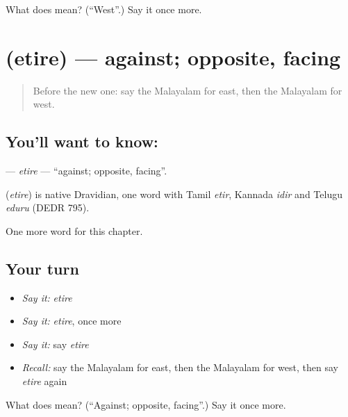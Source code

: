 \begin{tcolorbox}[breakable,colback=teal!4,colframe=teal!35!black,title={Before you move on}]
What does  mean? (\textquotedblleft{}West\textquotedblright{}.) Say it once more.
\end{tcolorbox}
\section[\texorpdfstring{\ml{എതിരെ} (etire)}{എതിരെ (etire)}]{ (etire) — against; opposite, facing}

\label{lesson:ML-C198-etire}



\begin{quote}
Before the new one: say the Malayalam for east, then the Malayalam for west.
\end{quote}

\subsection*{You'll want to know: }
\textbf{} — \emph{etire} — \textquotedblleft{}against; opposite, facing\textquotedblright{}.

\begin{cousinweb}
\textbf{} (\emph{etire}) is native Dravidian, one word with Tamil \emph{etir}, Kannada \emph{idir} and Telugu \emph{eduru} (DEDR 795).
\end{cousinweb}

\begin{grammarlens}[title={What you've built}]
One more word for this chapter.
\end{grammarlens}

\subsection*{Your turn}
\begin{itemize}
\raggedright
  \item \emph{Say it:} \emph{etire}
  \item \emph{Say it:} \emph{etire}, once more
  \item \emph{Say it:} say \emph{etire}
  \item \emph{Recall:} say the Malayalam for east, then the Malayalam for west, then say \emph{etire} again
\end{itemize}

\begin{tcolorbox}[breakable,colback=teal!4,colframe=teal!35!black,title={Before you move on}]
What does  mean? (\textquotedblleft{}Against; opposite, facing\textquotedblright{}.) Say it once more.
\end{tcolorbox}

